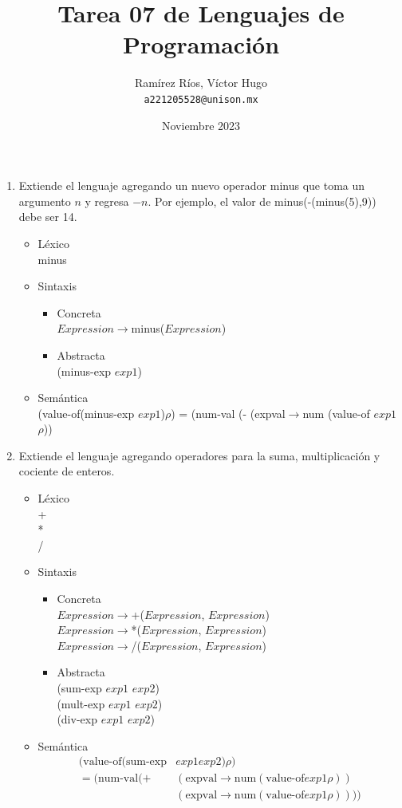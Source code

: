 \documentclass{article}
\title{Tarea 07 de Lenguajes de Programación}
\author{
  Ramírez Ríos, Víctor Hugo\\
  \texttt{a221205528@unison.mx}
}
\date{Noviembre 2023}
\begin{document}
\maketitle

\begin{enumerate}
    \item Extiende el lenguaje agregando un nuevo operador minus que toma un argumento $n$ y regresa $-n$. Por ejemplo, el valor de minus(-(minus(5),9)) debe ser 14.
    \begin{itemize}
        \item Léxico \\
        minus
        \item Sintaxis 
        \begin{itemize}
            \item Concreta \\
            $Expression$$\to$minus($Expression$)
            \item Abstracta \\
            (minus-exp $exp1$)
        \end{itemize}
        \item Semántica \\
        (value-of(minus-exp $exp1$)$\rho$) = (num-val (- (expval$\to$num (value-of $exp1$ $\rho$))
    \end{itemize}
    \item Extiende el lenguaje agregando operadores para la suma, multiplicación y cociente de enteros.
    \begin{itemize}
        \item Léxico \\
        + \\
        * \\
        / 
        \item Sintaxis 
        \begin{itemize}
            \item Concreta \\
            $Expression$$\to$+($Expression$, $Expression$) \\
            $Expression$$\to$*($Expression$, $Expression$) \\
            $Expression$$\to$/($Expression$, $Expression$) 
            \item Abstracta \\
            (sum-exp $exp1$ $exp2$) \\
            (mult-exp $exp1$ $exp2$) \\
            (div-exp $exp1$ $exp2$)
        \end{itemize}
        \item Semántica 
        \begin{align*}
            (\text{value-of}(\text{sum-exp}& exp1 exp2) \rho ) \\
            =(\text{num-val} (+ &(\text{expval} \to \text{num} (\text{value-of} exp1 \rho))\\
            &(\text{expval} \to \text{num} ( \text{value-of} exp1 \rho))))
        \end{align*}
        

\end{itemize}
\end{enumerate}
\end{document}
